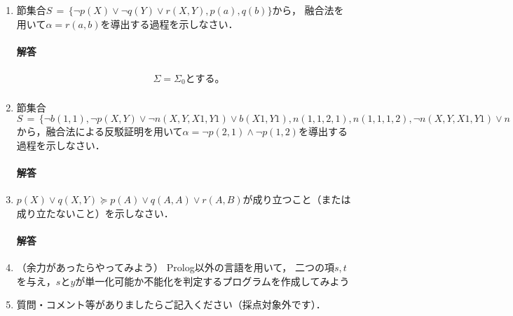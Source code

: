 \documentclass[dvipdfmx]{jsarticle}
\begin{document}
\begin{enumerate}
  \paragraph{解答}
  \begin{enumerate}
    \item $\theta = \{ X/a, Y/Z, Z/b\}$
    \item $\theta = \{ X/Y, Y/jhon \}$
    \item $\theta = \{ X/s(0), Y/s(s(0)), Z/0\}$
    \item $\{ X/Y, Y/s(Y) \}$
    \item 存在しない。
  \end{enumerate}


\item
  節集合$S\,=\,\{  \neg p(X)\lor \neg q(Y)\lor r(X,Y), p(a), q(b)  \}$から，
  融合法を用いて$\alpha=r(a,b)$を導出する過程を示しなさい．
  \paragraph{解答}
  \begin{align*}
    &\Sigma = \Sigma_{0}とする。\\
  \end{align*}

\item 節集合
  $S\,=\,\{
  \neg b(1,1), \neg p(X,Y)\lor \neg n(X,Y,X1,Y1)\lor b(X1,Y1),
  n(1,1,2,1), n(1,1,1,2), \neg n(X,Y,X1,Y1)\lor n(X1,Y1,X,Y), n(X,Y,X1,Y1)\lor \neg n(X1,Y1,X,Y)
  \}$
  から，融合法による反駁証明を用いて$\alpha=\neg p(2,1)\land \neg p(1,2)$を導出する過程を示しなさい．
  \paragraph{解答}



\item $p(X) \lor q(X,Y)\succeq p(A) \lor q(A,A) \lor r(A,B)$が成り立つこと（または成り立たないこと）を示しなさい．
\paragraph{解答}


\item （余力があったらやってみよう）
  Prolog以外の言語を用いて，
  二つの項$s,t$を与え，$s$と$y$が単一化可能か不能化を判定するプログラムを作成してみよう

\item 質問・コメント等がありましたらご記入ください（採点対象外です）．
\end{enumerate}
\end{document}
